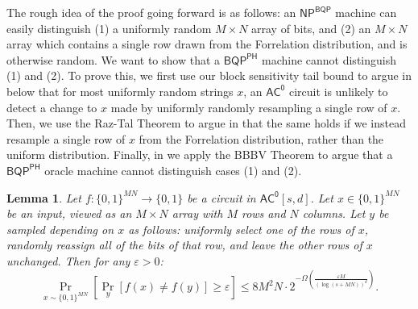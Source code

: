 \documentclass[10pt,a4paper]{article}
\newtheorem{lemma}[theorem]{Lemma}
\newcommand{\eps}{\varepsilon}
\begin{document}
The rough idea of the proof going forward is as follows: an $\mathsf{NP}^\mathsf{BQP}$ machine can easily distinguish (1) a uniformly random $M \times N$ array of bits, and (2) an $M \times N$ array which contains a single row drawn from the Forrelation distribution, and is otherwise random. We want to show that a $\mathsf{BQP}^\mathsf{PH}$ machine cannot distinguish (1) and (2). To prove this, we first use our block sensitivity tail bound to argue in  below that for most uniformly random strings $x$, an $\mathsf{AC^0}$ circuit is unlikely to detect a change to $x$ made by uniformly randomly resampling a single row of $x$. Then, we use the Raz-Tal Theorem to argue in  that the same holds if we instead resample a single row of $x$ from the Forrelation distribution, rather than the uniform distribution. Finally, in  we apply the BBBV Theorem to argue that a $\mathsf{BQP}^\mathsf{PH}$ oracle machine cannot distinguish cases (1) and (2).


\begin{lemma}
\label{lem:ac0_block_averaged_sensitivity_tail_bound}
Let $f: \{0,1\}^{MN} \to \{0,1\}$ be a circuit in $\mathsf{AC^0}[s, d]$. Let $x \in \{0,1\}^{MN}$ be an input, viewed as an $M \times N$ array with $M$ rows and $N$ columns. Let $y$ be sampled depending on $x$ as follows: uniformly select one of the rows of $x$, randomly reassign all of the bits of that row, and leave the other rows of $x$ unchanged. Then for any $\eps > 0$:
\[
\Pr_{x \sim \{0,1\}^{MN}}\left[\Pr_y\left[f(x) \neq f(y)\right] \ge \eps \right] \le 8M^2N \cdot 2^{-\Omega\left(\frac{\eps M}{(\log(s + MN))^d}\right)}.
\]
\end{lemma}
\end{document}
